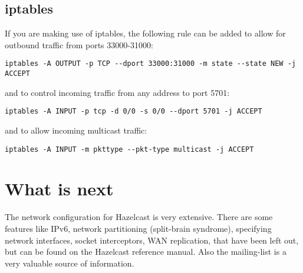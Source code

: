 \subsection{iptables}
If you are making use of iptables, the following rule can be added to allow for outbound traffic from ports 33000-31000:
\begin{lstlisting}
iptables -A OUTPUT -p TCP --dport 33000:31000 -m state --state NEW -j ACCEPT
\end{lstlisting}
and to control incoming traffic from any address to port 5701:
\begin{lstlisting}
iptables -A INPUT -p tcp -d 0/0 -s 0/0 --dport 5701 -j ACCEPT
\end{lstlisting}
and to allow incoming multicast traffic:
\begin{lstlisting}
iptables -A INPUT -m pkttype --pkt-type multicast -j ACCEPT
\end{lstlisting}

\section{What is next}
The network configuration for Hazelcast is very extensive. There are some features like IPv6,  network partitioning (split-brain syndrome), specifying network interfaces, socket interceptors, WAN replication, that have been left out, but can be found on the Hazelcast reference manual. Also the mailing-list is a very valuable source of information.


